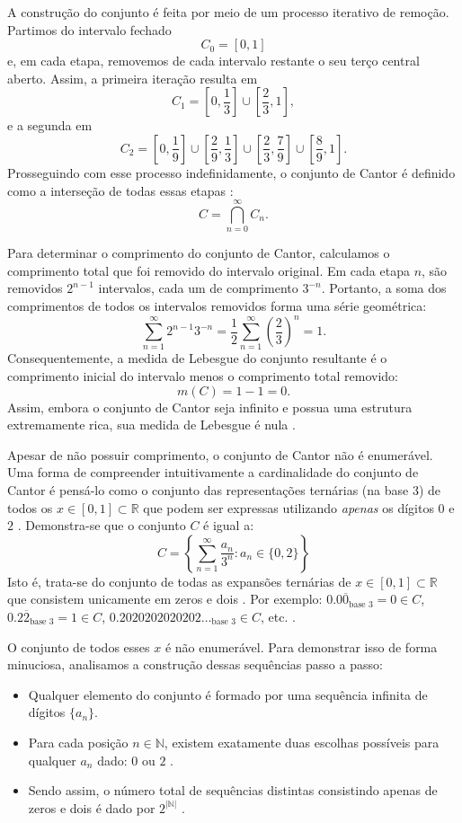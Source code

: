 A construção do conjunto é feita por meio de um processo iterativo de remoção. Partimos do intervalo fechado
\[
    C_0 = [0,1]
\]
e, em cada etapa, removemos de cada intervalo restante o seu terço central aberto. Assim, a primeira iteração resulta em
\[
    C_1 = \left[0,\frac{1}{3}\right] \cup \left[\frac{2}{3},1\right],
\]
e a segunda em
\[
    C_2 = \left[0,\frac{1}{9}\right] \cup \left[\frac{2}{9},\frac{1}{3}\right] \cup \left[\frac{2}{3},\frac{7}{9}\right] \cup \left[\frac{8}{9},1\right].
\]
Prosseguindo com esse processo indefinidamente, o conjunto de Cantor é definido como a interseção de todas essas etapas \cite[p.~46]{royden2022}:
\[
    C = \bigcap_{n=0}^{\infty} C_n.
\]



Para determinar o comprimento do conjunto de Cantor, calculamos o comprimento total que foi removido do intervalo original. Em cada etapa \(n\), são removidos \(2^{n-1}\) intervalos, cada um de comprimento \(3^{-n}\). Portanto, a soma dos comprimentos de todos os intervalos removidos forma uma série geométrica:
\[
    \sum_{n=1}^{\infty} 2^{n-1} 3^{-n} = \frac{1}{2} \sum_{n=1}^{\infty} \left(\frac{2}{3}\right)^n = 1.
\]
Consequentemente, a medida de Lebesgue do conjunto resultante é o comprimento inicial do intervalo menos o comprimento total removido:
\[
    m(C) = 1 - 1 = 0.
\]
Assim, embora o conjunto de Cantor seja infinito e possua uma estrutura extremamente rica, sua medida de Lebesgue é nula \cite[p.~47]{royden2022}.

Apesar de não possuir comprimento, o conjunto de Cantor não é enumerável. Uma forma de compreender intuitivamente a cardinalidade do conjunto de Cantor é pensá-lo como o conjunto das representações ternárias (na base 3) de todos os \(x \in [0, 1] \subset \mathbb{R}\) que podem ser expressas utilizando \textit{apenas} os dígitos \(0\) e \(2\) \parencite{amWhy2012}. Demonstra-se que o conjunto \(C\) é igual a:
\[
    C = \left\{ \sum_{n=1}^{\infty} \frac{a_n}{3^n} : a_n \in \{0, 2\} \right\}
\]
Isto é, trata-se do conjunto de todas as expansões ternárias de \(x \in [0, 1] \subset \mathbb{R}\) que consistem unicamente em zeros e dois . Por exemplo: \(0.0\overline{0}_{\text{base } 3} = 0 \in C\), \(0.2\overline{2}_{\text{base } 3} = 1 \in C\), \(0.2020202020202\dots_{\text{base } 3} \in C\), etc. .

O conjunto de todos esses \(x\) é não enumerável. Para demonstrar isso de forma minuciosa, analisamos a construção dessas sequências passo a passo:
\begin{itemize}
    \item Qualquer elemento do conjunto é formado por uma sequência infinita de dígitos \(\{a_n\}\).
    \item Para cada posição \(n \in \mathbb{N}\), existem exatamente duas escolhas possíveis para qualquer \(a_n\) dado: \(0\) ou \(2\) .
    \item Sendo assim, o número total de sequências distintas consistindo apenas de zeros e dois é dado por \(2^{|\mathbb{N}|}\) .
\end{itemize}

